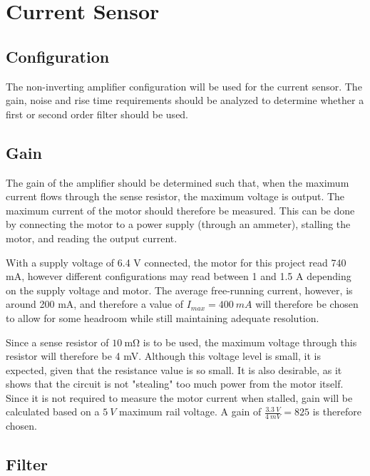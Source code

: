 \graphicspath{{content/2_design/figures/}}
\section{Current Sensor}{\label{design_currentSensor}}
\subsection{Configuration}

The non-inverting amplifier configuration will be used for the current sensor. The gain, noise and rise time requirements should be analyzed to determine whether
a first or second order filter should be used.

\subsection{Gain}

The gain of the amplifier should be determined such that, when the maximum current flows through the sense resistor, the maximum voltage is output.
The maximum current of the motor should therefore be measured. This can be done by connecting the motor to a power supply (through an ammeter), stalling the motor, and reading the output current.

With a supply voltage of 6.4 V connected, the motor for this project read 740 mA, however different configurations may read between 1 and 1.5 A depending on the supply voltage and motor.
The average free-running current, however, is around 200 mA, and therefore a value of $I_{max} = \SI{400}{mA}$ will therefore be chosen to allow for some headroom while still maintaining adequate
resolution.

Since a sense resistor of $\SI{10}{\milli\ohm}$ is to be used, the maximum voltage through this resistor will therefore be 4 mV. Although this voltage level is small, it is expected, given that the resistance value is so small.
It is also desirable, as it shows that the circuit is not "stealing" too much power from the motor itself. Since it is not required to measure the motor current when stalled, gain will be calculated
based on a $\SI{5}{V}$ maximum rail voltage. A gain of $\frac{\SI{3.3}{V}}{\SI{4}{mV}} = 825$ is therefore chosen.

\subsection{Filter}

